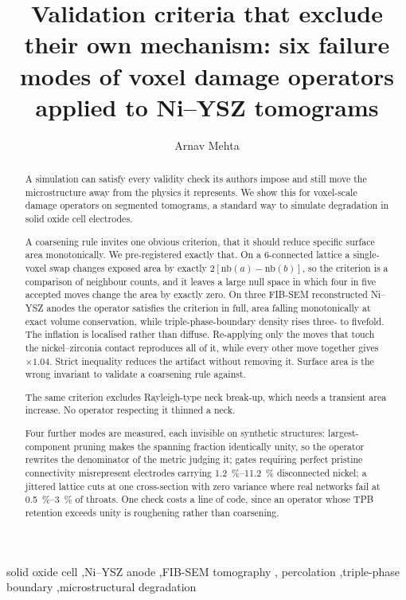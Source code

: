 \documentclass[5p,times,twocolumn]{elsarticle}
\newcommand{\nb}{\mathrm{nb}}
\begin{document}
\begin{frontmatter}

\title{Validation criteria that exclude their own mechanism: six failure
modes of voxel damage operators applied to Ni--YSZ tomograms}


\author[a]{Arnav Mehta}
\address[a]{Department of Mechanical Engineering, University of Wisconsin--Madison, Madison, WI, USA}



\begin{abstract}
A simulation can satisfy every validity check its authors impose and still move
the microstructure away from the physics it represents. We show this for
voxel-scale damage operators on segmented tomograms, a standard way to simulate
degradation in solid oxide cell electrodes.

A coarsening rule invites one obvious criterion, that it should reduce
specific surface area monotonically. We pre-registered exactly that. On a 6-connected
lattice a single-voxel swap changes exposed area by exactly $2[\nb(a)-\nb(b)]$,
so the criterion is a comparison of neighbour counts, and it leaves a large
null space in which four in five accepted moves change the area by exactly
zero. On three FIB-SEM reconstructed Ni--YSZ anodes the operator satisfies
the criterion in full, area falling monotonically at exact volume conservation,
while triple-phase-boundary density rises three- to fivefold. The inflation is
localised rather than diffuse. Re-applying only the moves that touch the
nickel--zirconia contact reproduces all of it, while every other move together
gives $\times1.04$. Strict inequality
reduces the artifact without removing it. Surface area is the wrong invariant
to validate a coarsening rule against.

The same criterion excludes Rayleigh-type neck break-up, which needs a
transient area increase. No operator respecting it thinned a neck.

Four further modes are measured, each invisible on synthetic structures:
largest-component pruning makes the spanning fraction identically unity, so the
operator rewrites the denominator of the metric judging it; gates requiring
perfect pristine connectivity misrepresent electrodes carrying
\SIrange{1.2}{11.2}{\percent} disconnected nickel; a jittered lattice cuts at
one cross-section with zero variance where real networks fail at
\SIrange{0.5}{3}{\percent} of throats. One check costs a line of code, since an operator whose TPB retention exceeds
unity is roughening rather than coarsening.
\end{abstract}

\begin{keyword}
solid oxide cell \sep Ni--YSZ anode \sep FIB-SEM tomography \sep
percolation \sep triple-phase boundary \sep microstructural degradation
\end{keyword}

\end{frontmatter}
\end{document}
